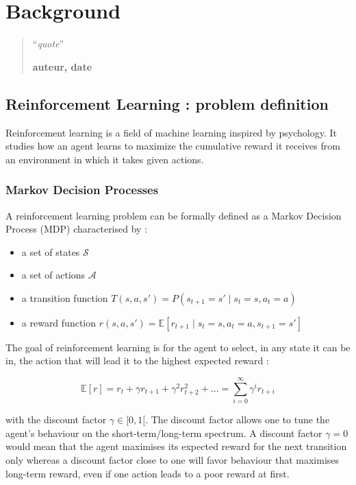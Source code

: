 \chapter{Background}
\begin{quotation}
\noindent ``\emph{quote}''
\begin{flushright}\textbf{auteur, date}\end{flushright}
\end{quotation}

\vspace*{0.5cm}

\section{Reinforcement Learning : problem definition}
Reinforcement learning is a field of machine learning inspired by psychology.
It studies how an agent learns to maximize the cumulative reward it receives
from an environment in which it takes given actions. 

\subsection{Markov Decision Processes}
A reinforcement learning problem can be formally defined as a Markov 
Decision Process (MDP)  characterised by :
\begin{itemize}
	\item a set of states $\mathcal{S}$
	\item a set of actions $\mathcal{A}$
	\item a transition function 
		$T(s, a, s') = P(s_{t+1} = s' \mid s_t = s, a_t = a)$
	\item a reward function 
		$r(s, a, s') = \mathbb{E}
		 [r_{t+1} \mid s_t = s, a_t = a, s_{t+1} = s']$
\end{itemize}

The goal of reinforcement learning is for the agent to select, in any state it
can be in, the action that will lead it to the highest expected reward :

$$ \mathbb{E}[r] = r_t + \gamma r_{t+1} + \gamma^2 r_{t+2}^2 + ... =
 \sum\limits_{i=0}^\infty \gamma^i r_{t+i}$$

\noindent with the discount factor  $\gamma \in [0, 1[$.
The discount factor allows one to tune the agent's behaviour on the
short-term/long-term spectrum. A discount factor $\gamma=0$ would mean that the
agent maximises its expected reward for the next transition only whereas a
discount factor close to one will favor behaviour that maximises long-term
reward, even if one action leads to a poor reward at first.\\

